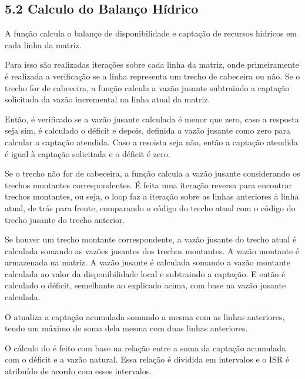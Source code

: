 \documentclass[a4paper,10pt,brazil]{sphinxmanual}
\begin{document}
\subsection{5.2 Calculo do Balanço Hídrico}
\label{\detokenize{5calculoBalanco:id1}}
\sphinxAtStartPar
A função  calcula o balanço de disponibilidade e captação de recursos hídricos em cada linha da matriz.

\sphinxAtStartPar
Para isso são realizadas iterações sobre cada linha da matriz, onde primeiramente é realizada a verificação se a linha representa um trecho de cabeceira ou não. Se o trecho for de cabeceira, a função calcula a vazão jusante subtraindo a captação solicitada da vazão incremental na linha atual da matriz.

\sphinxAtStartPar
Então, é verificado se a vazão jusante calculada é menor que zero, caso a resposta seja sim, é calculado o déficit e depois, definida a vazão jusante como zero para calcular a captação atendida. Caso a resoista seja não, então a captação atendida é igual à captação solicitada e o déficit é zero.

\sphinxAtStartPar
Se o trecho não for de cabeceira, a função calcula a vazão jusante considerando os trechos montantes correspondentes. É feita uma iteração reversa para encontrar trechos montantes, ou seja, o loop faz a iteração sobre as linhas anteriores à linha atual, de trás para frente, comparando o código do trecho atual com o código do trecho jusante do trecho anterior.

\sphinxAtStartPar
Se houver um trecho montante correspondente, a vazão jusante do trecho atual é calculada somando as vazões jusantes dos trechos montantes. A vazão montante é armazenada na matriz. A vazão jusante é calculada somando a vazão montante calculada ao valor da disponibilidade local e subtraindo a captação. E então é calculado o déficit, semelhante ao explicado acima, com base na vazão jusante calculada.

\sphinxAtStartPar
O  atualiza a captação acumulada somando a mesma com as linhas anteriores, tendo um máximo de soma dela mesma com duas linhas anteriores.

\sphinxAtStartPar
O cálculo do  é feito com base na relação entre a soma da captação acumulada com o déficit e a vazão natural. Essa relação é dividida em intervalos e o ISR é atribuído de acordo com esses intervalos.
\end{document}

